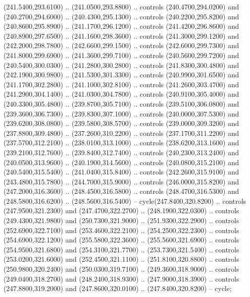 {\begin{scope}[y=0.80pt, x=0.80pt, yscale=-1, xscale=1, inner sep=0pt, outer sep=0pt, #1]
      (241.5400,293.6100) .. (241.0500,293.8800) .. controls (240.4700,294.0200) and
      (240.2700,294.6000) .. (240.4300,295.1300) .. controls (240.2200,295.8200) and
      (240.8600,295.8900) .. (241.1700,296.1200) .. controls (241.4200,296.8600) and
      (240.8900,297.6500) .. (241.1600,298.3600) .. controls (241.3000,299.1200) and
      (242.2000,298.7800) .. (242.6600,299.1500) .. controls (242.6000,299.7300) and
      (241.8000,299.6900) .. (241.3600,299.7100) .. controls (240.5600,299.7200) and
      (240.5400,300.0300) .. (241.2800,300.2800) .. controls (241.8300,300.4800) and
      (242.1900,300.9800) .. (241.5300,301.3300) .. controls (240.9900,301.6500) and
      (241.1700,302.2800) .. (241.1000,302.8100) .. controls (241.2600,303.4700) and
      (241.2900,304.1400) .. (241.0300,304.7800) .. controls (240.9100,305.4000) and
      (240.3300,305.4800) .. (239.8700,305.7100) .. controls (239.5100,306.0800) and
      (239.3600,306.7300) .. (239.8300,307.1000) .. controls (240.0000,307.5300) and
      (239.6200,308.0800) .. (239.5800,308.5700) .. controls (239.0000,309.3200) and
      (237.8800,309.4800) .. (237.2600,310.2200) .. controls (237.1700,311.2200) and
      (237.5700,312.2100) .. (238.0100,313.1000) .. controls (238.6200,313.1600) and
      (239.2100,312.7600) .. (239.8400,312.7400) .. controls (240.2300,313.2400) and
      (240.0500,313.9600) .. (240.1900,314.5600) .. controls (240.0800,315.2100) and
      (240.5400,315.5400) .. (241.0400,315.8400) .. controls (242.2600,315.9100) and
      (243.4800,315.7800) .. (244.7000,315.9000) .. controls (246.0000,315.8200) and
      (247.2000,316.3600) .. (248.4500,316.5800) .. controls (248.4700,316.5300) and
      (248.5800,316.6200) .. (248.5600,316.5400) -- cycle(247.8400,320.8200) ..
      controls (247.9500,321.2300) and (247.4700,322.2700) .. (248.1900,322.0300) ..
      controls (249.4300,321.9800) and (250.7300,321.9000) .. (251.9300,322.2900) ..
      controls (252.6900,322.7100) and (253.4600,322.2100) .. (254.2500,322.2300) ..
      controls (254.6900,322.1200) and (255.5800,322.3600) .. (255.5600,321.6900) ..
      controls (254.9500,321.6800) and (254.3100,321.7700) .. (253.7300,321.5400) ..
      controls (253.0200,321.6000) and (252.4500,321.1100) .. (251.8100,320.8800) ..
      controls (250.9800,320.2400) and (250.0300,319.7100) .. (249.3600,318.9000) ..
      controls (249.0400,318.2700) and (248.2400,318.9300) .. (247.9000,318.3900) ..
      controls (247.8800,319.2000) and (247.8600,320.0100) .. (247.8400,320.8200) --
      cycle;


\end{scope}}
